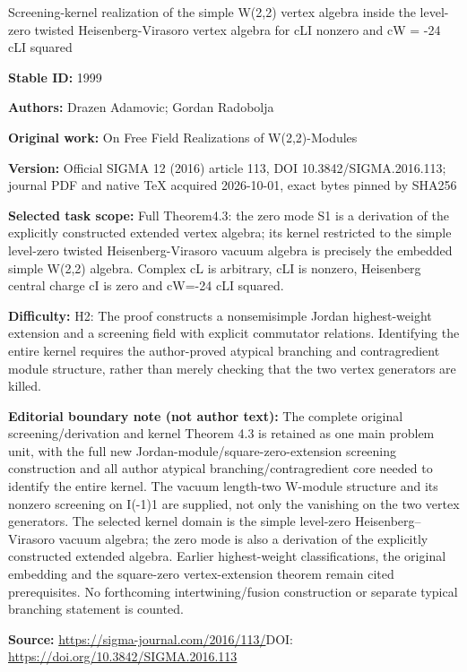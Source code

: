 \documentclass[11pt]{article}
\numberwithin{equation}{section}
\begin{document}
\begin{center}\Large Screening-kernel realization of the simple W(2,2) vertex algebra inside the level-zero twisted Heisenberg-Virasoro vertex algebra for cLI nonzero and cW =\allowbreak{} -24 cLI squared\end{center}
\noindent\textbf{Stable ID:} 1999\par
\noindent\textbf{Authors:} Drazen Adamovic; Gordan Radobolja\par
\noindent\textbf{Original work:} On Free Field Realizations of W(2,2)-Modules\par
\noindent\textbf{Version:} Official SIGMA 12 (2016) article 113, DOI 10.3842/SIGMA.2016.113; journal PDF and native TeX acquired 2026-10-01, exact bytes pinned by SHA256\par
\noindent\textbf{Selected task scope:} Full Theorem4.3: the zero mode S1 is a derivation of the explicitly constructed extended vertex algebra; its kernel restricted to the simple level-zero twisted Heisenberg-Virasoro vacuum algebra is precisely the embedded simple W(2,2) algebra. Complex cL is arbitrary, cLI is nonzero, Heisenberg central charge cI is zero and cW=\allowbreak{}-24 cLI squared.\par
\noindent\textbf{Difficulty:} H2: The proof constructs a nonsemisimple Jordan highest-weight extension and a screening field with explicit commutator relations. Identifying the entire kernel requires the author-proved atypical branching and contragredient module structure, rather than merely checking that the two vertex generators are killed.\par
\noindent\textbf{Editorial boundary note (not author text):} The complete original screening/derivation and kernel Theorem 4.3 is retained as one main problem unit, with the full new Jordan-module/square-zero-extension screening construction and all author atypical branching/contragredient core needed to identify the entire kernel. The vacuum length-two W-module structure and its nonzero screening on I(-1)1 are supplied, not only the vanishing on the two vertex generators. The selected kernel domain is the simple level-zero Heisenberg–Virasoro vacuum algebra; the zero mode is also a derivation of the explicitly constructed extended algebra. Earlier highest-weight classifications, the original embedding and the square-zero vertex-extension theorem remain cited prerequisites. No forthcoming intertwining/fusion construction or separate typical branching statement is counted.\par
\noindent\textbf{Source:} \url{https://sigma-journal.com/2016/113/}\quad DOI: \url{https://doi.org/10.3842/SIGMA.2016.113}\par
\end{document}
